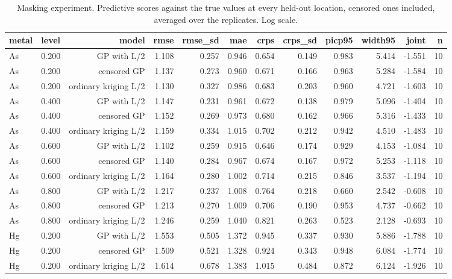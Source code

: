 \begin{table}[htbp]
\centering
\caption{Masking experiment. Predictive scores against the true values at every held-out location, censored ones included, averaged over the replicates. Log scale.}
\label{tab:masking}
\footnotesize
\begin{tabular}{llrrrrrrrrrr}
\toprule
metal & level & model & rmse & rmse\_sd & mae & crps & crps\_sd & picp95 & width95 & joint & n \\
\midrule
As & 0.200 & GP with L/2 & 1.108 & 0.257 & 0.946 & 0.654 & 0.149 & 0.983 & 5.414 & -1.551 & 10 \\
As & 0.200 & censored GP & 1.137 & 0.273 & 0.960 & 0.671 & 0.166 & 0.963 & 5.284 & -1.584 & 10 \\
As & 0.200 & ordinary kriging L/2 & 1.130 & 0.327 & 0.986 & 0.683 & 0.203 & 0.960 & 4.721 & -1.603 & 10 \\
As & 0.400 & GP with L/2 & 1.147 & 0.231 & 0.961 & 0.672 & 0.138 & 0.979 & 5.096 & -1.404 & 10 \\
As & 0.400 & censored GP & 1.152 & 0.269 & 0.973 & 0.680 & 0.162 & 0.966 & 5.316 & -1.433 & 10 \\
As & 0.400 & ordinary kriging L/2 & 1.159 & 0.334 & 1.015 & 0.702 & 0.212 & 0.942 & 4.510 & -1.483 & 10 \\
As & 0.600 & GP with L/2 & 1.102 & 0.259 & 0.915 & 0.646 & 0.174 & 0.929 & 4.153 & -1.084 & 10 \\
As & 0.600 & censored GP & 1.140 & 0.284 & 0.967 & 0.674 & 0.167 & 0.972 & 5.253 & -1.118 & 10 \\
As & 0.600 & ordinary kriging L/2 & 1.164 & 0.280 & 1.002 & 0.714 & 0.215 & 0.846 & 3.537 & -1.194 & 10 \\
As & 0.800 & GP with L/2 & 1.217 & 0.237 & 1.008 & 0.764 & 0.218 & 0.660 & 2.542 & -0.608 & 10 \\
As & 0.800 & censored GP & 1.213 & 0.270 & 1.009 & 0.706 & 0.190 & 0.953 & 4.737 & -0.662 & 10 \\
As & 0.800 & ordinary kriging L/2 & 1.246 & 0.259 & 1.040 & 0.821 & 0.263 & 0.523 & 2.128 & -0.693 & 10 \\
Hg & 0.200 & GP with L/2 & 1.553 & 0.505 & 1.372 & 0.945 & 0.337 & 0.930 & 5.886 & -1.788 & 10 \\
Hg & 0.200 & censored GP & 1.509 & 0.521 & 1.328 & 0.924 & 0.343 & 0.948 & 6.084 & -1.774 & 10 \\
Hg & 0.200 & ordinary kriging L/2 & 1.614 & 0.678 & 1.383 & 1.015 & 0.484 & 0.872 & 6.124 & -1.926 & 10 \\

\end{tabular}
\end{table}
